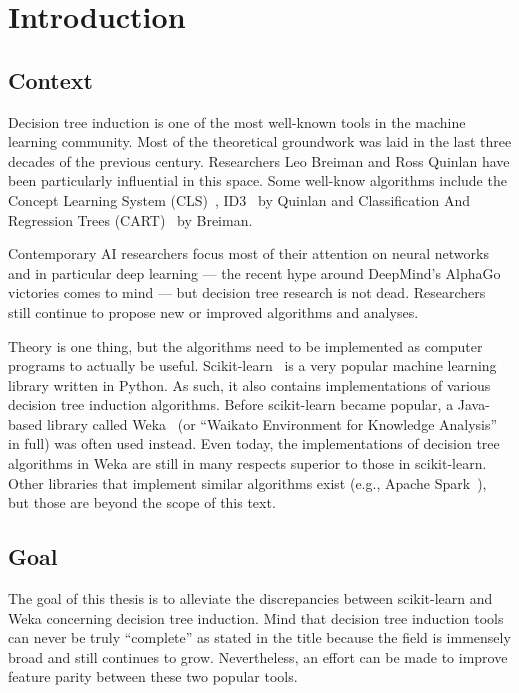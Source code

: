 \chapter{Introduction}\label{cha:intro}

\section{Context}
Decision tree induction is one of the most well-known tools in the machine learning community. Most of the theoretical groundwork was laid in the last three decades of the previous century. Researchers Leo Breiman and Ross Quinlan have been particularly influential in this space. Some well-know algorithms include the Concept Learning System (CLS)~\cite{cls}, ID3~\cite{id3, id3bis, id3ter} by Quinlan and Classification And Regression Trees (CART)~\cite{cart} by Breiman. 

Contemporary AI researchers focus most of their attention on neural networks and in particular deep learning --- the recent hype around DeepMind's AlphaGo~\cite{alphago} victories comes to mind --- but decision tree research is not dead. Researchers still continue to propose new or improved algorithms and analyses.

Theory is one thing, but the algorithms need to be implemented as computer programs to actually be useful. Scikit-learn~\cite{scikit-learn} is a very popular machine learning library written in Python. As such, it also contains implementations of various decision tree induction algorithms. Before scikit-learn became popular, a Java-based library called Weka~\cite{eibe2016weka} (or ``Waikato Environment for Knowledge Analysis'' in full) was often used instead. Even today, the implementations of decision tree algorithms in Weka are still in many respects superior to those in scikit-learn. Other libraries that implement similar algorithms exist (e.g., Apache Spark~\cite{spark}), but those are beyond the scope of this text.

\section{Goal}
The goal of this thesis is to alleviate the discrepancies between scikit-learn and Weka concerning decision tree induction. Mind that decision tree induction tools can never be truly ``complete'' as stated in the title because the field is immensely broad and still continues to grow. Nevertheless, an effort can be made to improve feature parity between these two popular tools.

